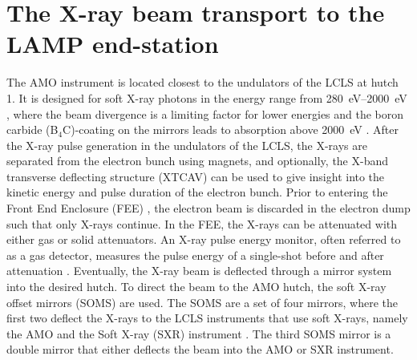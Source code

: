 \section{The X-ray beam transport to the LAMP end-station}\label{sec:amo-instrument}
The AMO instrument is located closest to the undulators of the LCLS at hutch 1. It is designed for soft X-ray photons in the energy range from \SIrange{280}{2000}{\electronvolt} \citep{Ferguson-2015-JSR,Bozek-2009-EPJST}, where the beam divergence is a limiting factor for lower energies and the boron carbide (B$_{4}$C)-coating on the mirrors leads to absorption above \SI{2000}{\electronvolt} \cite{Bozek-2009-EPJST}. After the X-ray pulse generation in the undulators of the LCLS, the X-rays are separated from the electron bunch using magnets, and optionally, the X-band transverse deflecting structure (XTCAV) \citep{Behrens-2014-NatCom} can be used to give insight into the kinetic energy and pulse duration of the electron bunch. Prior to entering the Front End Enclosure (FEE) \citep{Moeller-2011-NIMPR}, the electron beam is discarded in the electron dump such that only X-rays continue. In the FEE, the X-rays can be attenuated with either gas or solid attenuators. An X-ray pulse energy monitor, often referred to as a gas detector, measures the pulse energy of a single-shot before and after attenuation \citep{Hau-Riege-2010-PRL-2}. Eventually, the X-ray beam is deflected through a mirror system into the desired hutch. To direct the beam to the AMO hutch, the soft X-ray offset mirrors (SOMS) are used. The SOMS are a set of four mirrors, where the first two deflect the X-rays to the LCLS instruments that use soft X-rays, namely the AMO and the Soft X-ray (SXR) instrument \citep{Schlotter-2012-RSI,Soufli-2012-AppOpt,Dakovski-2015-JSR}. The third SOMS mirror is a double mirror that either deflects the beam into the AMO or SXR instrument.
%
